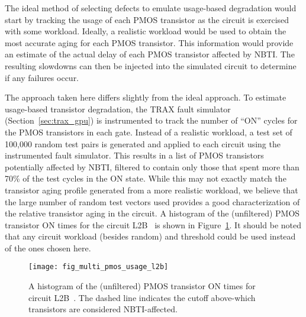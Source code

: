 The ideal method of selecting defects to emulate usage-based degradation would start by tracking the usage of each PMOS transistor as the circuit is exercised with some workload.
%
Ideally, a realistic workload would be used to obtain the most accurate aging for each PMOS transistor.
%
This information would provide an estimate of the actual delay of each PMOS transistor affected by NBTI.
%
The resulting slowdowns can then be injected into the simulated circuit to determine if any failures occur.

The approach taken here differs slightly from the ideal approach.
%
To estimate usage-based transistor degradation, the TRAX fault simulator (Section~\ref{sec:trax_gpu}) is instrumented to track the number of ``ON'' cycles for the PMOS transistors in each gate.
%
Instead of a realistic workload, a test set of 100,000 random test pairs is generated and applied to each circuit using the instrumented fault simulator.
%
This results in a list of PMOS transistors potentially affected by NBTI, filtered to contain only those that spent more than 70\% of the test cycles in the ON state.
%
While this may not exactly match the transistor aging profile generated from a more realistic workload, we believe that the large number of random test vectors used provides a good characterization of the relative transistor aging in the circuit.
%
A histogram of the (unfiltered) PMOS transistor ON times for the circuit L2B~\cite{sun11} is shown in Figure~\ref{fig:multi_pmos_usage_l2b}.
%
It should be noted that any circuit workload (besides random) and threshold could be used instead of the ones chosen here.

\begin{figure}[hbtp]
\centering
\texttt{[image: fig\_multi\_pmos\_usage\_l2b]}
\caption{A histogram of the (unfiltered) PMOS transistor ON times for circuit L2B~\cite{sun11}.
%
The dashed line indicates the cutoff above-which transistors are considered NBTI-affected.}
\label{fig:multi_pmos_usage_l2b}
\end{figure}


